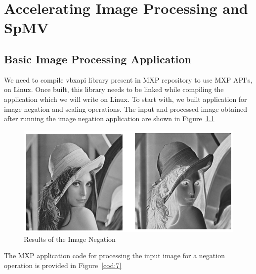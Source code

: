 \newpage
\chapter{Accelerating Image Processing and SpMV}

\section{Basic Image Processing Application}

We need to compile vbxapi library present in MXP repository to use MXP API’s, on Linux. Once built, this library needs to be linked while compiling the application which we will write on Linux. To start with, we built application for image negation and scaling operations. The input and processed image obtained after running the image negation application are shown in Figure~\ref{lena:7}

\begin{figure}
	\centering
	\includegraphics[width=.9\textwidth]{images/lena.png}
	\caption{Results of the Image Negation}
	\label{lena:7}
\end{figure}

The MXP application code for processing the input image for a negation operation is provided in Figure~\ref{cod:7}


%



